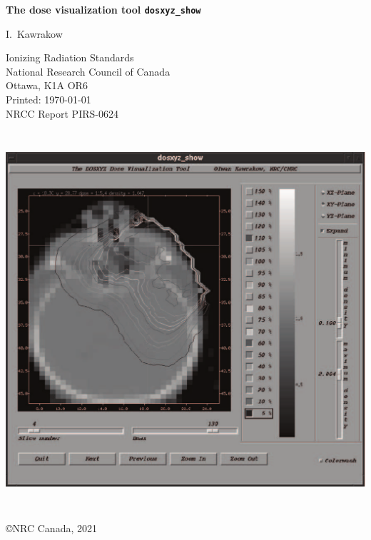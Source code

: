 \documentclass[12pt]{article}
\begin{document}
\pagestyle{empty}

\begin{center}

{\sffamily \bfseries \Huge The dose visualization tool {\tt dosxyz\_show}
\vspace{5mm}\\}
\begin{large}
I.~Kawrakow \\
\end{large}
Ionizing Radiation Standards\\
National Research Council of Canada
\\Ottawa, K1A OR6\\

Printed: \today
\\
\vspace{5mm}
\mbox{}\hfill NRCC Report {\sf PIRS-0624}\\

\vspace{1cm}

\includegraphics[height=14cm,width=16cm]{figures/dosxyz_show}


\vfill
\copyright NRC Canada, 2021
\end{center}
\end{document}

